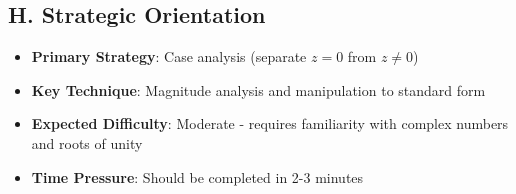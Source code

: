 \documentclass[11pt]{article}
\begin{document}
\begin{problembox}
\subsection*{H. Strategic Orientation}
\begin{itemize}[leftmargin=*]
    \item \textbf{Primary Strategy}: Case analysis (separate $z = 0$ from $z \neq 0$)
    \item \textbf{Key Technique}: Magnitude analysis and manipulation to standard form
    \item \textbf{Expected Difficulty}: Moderate - requires familiarity with complex numbers and roots of unity
    \item \textbf{Time Pressure}: Should be completed in 2-3 minutes
\end{itemize}
\end{problembox}
\end{document}

